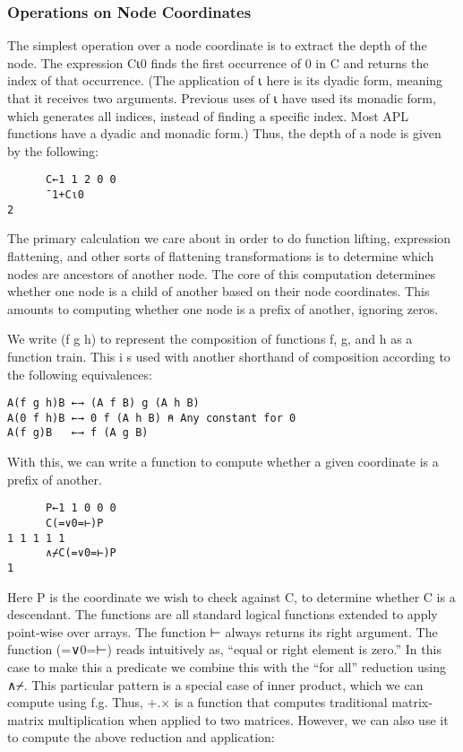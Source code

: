 \documentclass[numbers,preprint]{sigplanconf}
\begin{document}
\subsubsection{Operations on Node Coordinates}

The simplest operation over a node coordinate is to extract the depth of the node. The 
expression C⍳0 finds the first occurrence of 0 in C and returns the index of that 
occurrence. (The application of ⍳ here is its dyadic form, meaning that it receives two 
arguments. Previous uses of ⍳ have used its monadic form, which generates all indices, 
instead of finding a specific index. Most APL functions have a dyadic and monadic form.) 
Thus, the depth of a node is given by the following:

\begin{verbatim}
      C←1 1 2 0 0
      ¯1+C⍳0
2
\end{verbatim}

The primary calculation we care about in order to do function lifting, expression flattening, 
and other sorts of flattening transformations is to determine which nodes are ancestors of 
another node. The core of this computation determines whether one node is a child of another 
based on their node coordinates. This amounts to computing whether one node is a prefix of 
another, ignoring zeros.

We write (f g h) to represent the composition of functions f, g, and h as a function train. This i
s used with another shorthand of composition according to the following equivalences:

\begin{verbatim}
A(f g h)B ←→ (A f B) g (A h B)
A(0 f h)B ←→ 0 f (A h B) ⍝ Any constant for 0
A(f g)B   ←→ f (A g B)
\end{verbatim}

With this, we can write a function to compute whether a given coordinate is a prefix of another.

\begin{verbatim}
      P←1 1 0 0 0
      C(=∨0=⊢)P
1 1 1 1 1
      ∧⌿C(=∨0=⊢)P
1
\end{verbatim}

Here P is the coordinate we wish to check against C, to determine whether C is a descendant. The
 functions are all standard logical functions extended to apply point-wise over arrays. The 
 function ⊢ always returns its right argument. The function (=∨0=⊢) reads intuitively as, “equal or 
 right element is zero.” In this case to make this a predicate we combine this with the “for all” 
 reduction using ∧⌿. This particular pattern is a special case of inner product, which we can compute 
 using f.g. Thus, +.× is a function that computes traditional matrix-matrix multiplication when applied 
 to two matrices. However, we can also use it to compute the above reduction and application:
 
\end{document}
